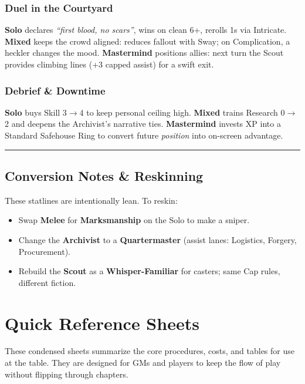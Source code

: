\documentclass[12pt]{book}
\begin{document}
\subsection*{Duel in the Courtyard}
\textbf{Solo} declares \emph{``first blood, no scars''}, wins on clean 6+, rerolls 1s via Intricate.  
\textbf{Mixed} keeps the crowd aligned: reduces fallout with Sway; on Complication, a heckler changes the mood.  
\textbf{Mastermind} positions allies: next turn the Scout provides climbing lines (+3 capped assist) for a swift exit.

\subsection*{Debrief \& Downtime}
\textbf{Solo} buys Skill 3$\rightarrow$4 to keep personal ceiling high.  
\textbf{Mixed} trains Research 0$\rightarrow$2 and deepens the Archivist’s narrative ties.  
\textbf{Mastermind} invests XP into a Standard Safehouse Ring to convert future \emph{position} into on-screen advantage.

\bigskip
\hrule
\bigskip

\section{Conversion Notes \& Reskinning}
These statlines are intentionally lean. To reskin:
\begin{itemize}
  \item Swap \textbf{Melee} for \textbf{Marksmanship} on the Solo to make a sniper.
  \item Change the \textbf{Archivist} to a \textbf{Quartermaster} (assist lanes: Logistics, Forgery, Procurement).
  \item Rebuild the \textbf{Scout} as a \textbf{Whisper-Familiar} for casters; same Cap rules, different fiction.
\end{itemize}

\chapter{Quick Reference Sheets}

These condensed sheets summarize the core procedures, costs, and tables for use at the table.  
They are designed for GMs and players to keep the flow of play without flipping through chapters.
\end{document}
